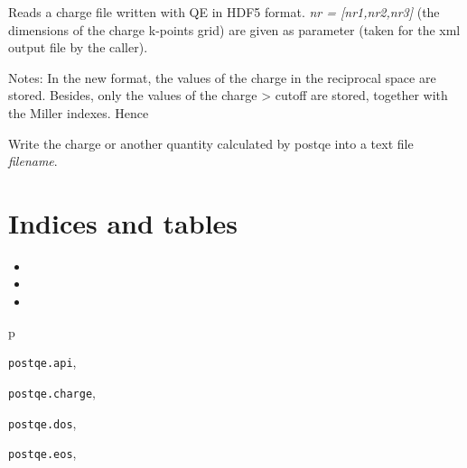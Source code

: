 \documentclass[letterpaper,10pt,english]{sphinxmanual}
\begin{document}

\begin{fulllineitems}
\label{postqe:postqe.charge.read_charge_file_hdf5}
Reads a charge file written with QE in HDF5 format. \emph{nr = {[}nr1,nr2,nr3{]}} (the dimensions of
the charge k-points grid) are given as parameter (taken for the xml output file by the caller).

Notes: In the new format, the values of the charge in the reciprocal space are stored.
Besides, only the values of the charge \textgreater{} cutoff are stored, together with the Miller indexes.
Hence

\end{fulllineitems}


\begin{fulllineitems}
\label{postqe:postqe.charge.write_charge}
Write the charge or another quantity calculated by postqe into a text file \emph{filename}.

\end{fulllineitems}



\chapter{Indices and tables}
\label{index:indices-and-tables}\begin{itemize}
\item {} 

\item {} 

\item {} 

\end{itemize}


\renewcommand{\indexname}{Python Module Index}
\begin{theindex}
\def\bigletter#1{{\Large\sffamily#1}\nopagebreak\vspace{1mm}}
\bigletter{p}
\item {\texttt{postqe.api}}, \pageref{postqe:module-postqe.api}
\item {\texttt{postqe.charge}}, \pageref{postqe:module-postqe.charge}
\item {\texttt{postqe.dos}}, \pageref{postqe:module-postqe.dos}
\item {\texttt{postqe.eos}}, \pageref{postqe:module-postqe.eos}
\end{theindex}

\renewcommand{\indexname}{Index}
\printindex
\end{document}

